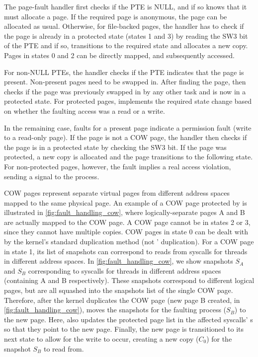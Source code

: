 \documentclass[letterpaper,twocolumn,10pt]{article}
\begin{document}
The page-fault handler first checks if the PTE is NULL, and if so
knows that it must allocate a page.
If the required page is anonymous, the page can be allocated as usual.
Otherwise, for file-backed pages, the handler has to check if the
page is already in a protected state (states 1 and 3) by reading
the SW3 bit of the PTE and if so, transitions to the required state
and allocates a new copy.
Pages in states 0 and 2 can be directly mapped, and subsequently
accessed.

For non-NULL PTEs, the handler checks if the PTE indicates that the
page is present.
Non-present pages need to be swapped in.
After finding the page, \midas then checks if the page was previously
swapped in by any other task and is now in a protected state.
For protected pages, \midas implements the required state change based
on whether the faulting access was a read or a write.

In the remaining case, faults for a present page indicate a
permission fault (write to a read-only page).
If the page is not a COW page, the handler then checks if the page
is in a protected state by checking the SW3 bit.
If the page was protected, a new copy is allocated and the page
transitions to the following state.
For non-protected pages, however, the fault implies a real access
violation, sending a signal to the process.

COW pages represent separate virtual pages from different
address spaces mapped to the same physical page.
An example of a COW page protected by \midas is illustrated in
\autoref{fig:fault_handling_cow}, where logically-separate pages A and B
are actually mapped to the COW page.
A COW page cannot be in states 2 or 3, since they cannot have multiple
\midas copies.
COW pages in state 0 can be dealt with by the kernel's standard
duplication method (not \midas' duplication).
For a COW page in state 1, its list of snapshots can correspond to
reads from syscalls for threads in different address spaces.
In \autoref{fig:fault_handling_cow}, we show snapshots $S_A$ and
$S_B$ corresponding to syscalls for threads in different address
spaces (containing A and B respectively).
These snapshots correspond to different logical pages, but are
all squashed into the snapshots list of the single COW page.
Therefore, after the kernel duplicates the COW page (new page
B created, in \autoref{fig:fault_handling_cow}), \midas moves
the snapshots for the faulting process ($S_B$) to the new page.
Here, \midas also updates the protected page list in the
affected syscalls' s so that they point to the
new page.
Finally, the new page is transitioned to its next state to allow
for the write to occur, creating a new copy ($C_0$) for the
snapshot $S_B$ to read from.
\end{document}
